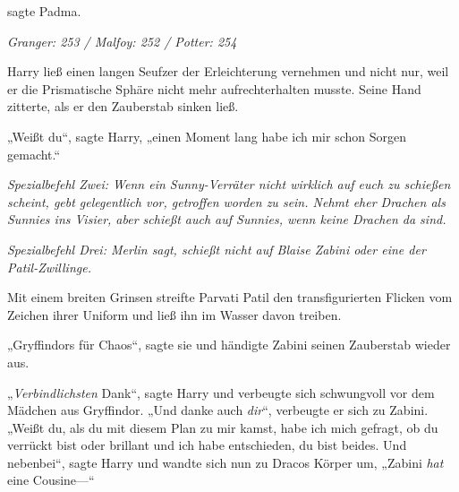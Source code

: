  sagte Padma.

\later

\emph{Granger: 253 / Malfoy: 252 / Potter: 254}

Harry ließ einen langen Seufzer der Erleichterung vernehmen und nicht nur, weil er die Prismatische Sphäre nicht mehr aufrechterhalten musste. Seine Hand zitterte, als er den Zauberstab sinken ließ.

„Weißt du“, sagte Harry, „einen Moment lang habe ich mir schon Sorgen gemacht.“

\emph{Spezialbefehl Zwei: Wenn ein Sunny-Verräter nicht wirklich auf euch zu schießen scheint, gebt gelegentlich vor, getroffen worden zu sein. Nehmt eher Drachen als Sunnies ins Visier, aber schießt auch auf Sunnies, wenn keine Drachen da sind.}

\emph{Spezialbefehl Drei: Merlin sagt, schießt nicht auf Blaise Zabini oder eine der Patil-Zwillinge.}

Mit einem breiten Grinsen streifte Parvati Patil den transfigurierten Flicken vom Zeichen ihrer Uniform und ließ ihn im Wasser davon treiben.

„Gryffindors für Chaos“, sagte sie und händigte Zabini seinen Zauberstab wieder aus.

„\emph{Verbindlichsten} Dank“, sagte Harry und verbeugte sich schwungvoll vor dem Mädchen aus Gryffindor. „Und danke auch \emph{dir}“, verbeugte er sich zu Zabini. „Weißt du, als du mit diesem Plan zu mir kamst, habe ich mich gefragt, ob du verrückt bist oder brillant und ich habe entschieden, du bist beides. Und nebenbei“, sagte Harry und wandte sich nun zu Dracos Körper um, „Zabini \emph{hat} eine Cousine—“

